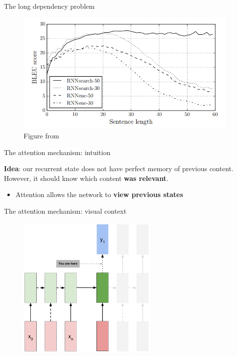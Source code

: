 \documentclass[12pt,aspectratio=169,handout]{beamer}
\begin{document}
\begin{frame}{The long dependency problem}
	\begin{figure}[h]
		\includegraphics[height=6cm]{sequence_length}
		\caption*{Figure from \cite{bahdanau2014neural}}
	\end{figure}
	
\end{frame}
	

\begin{frame}{The attention mechanism: intuition}

\textbf{Idea}: our recurrent state does not have perfect memory of previous content.
However, it should know which content \textbf{was relevant}.
\begin{itemize}
	\item Attention allows the network to \textbf{view previous states}
\end{itemize} 

\end{frame}

\begin{frame}{The attention mechanism: visual context}
	\begin{figure}[h]
		\includegraphics[height=7cm]{seq2seq_attention_motivation.pdf}
	\end{figure}	
\end{frame}
\end{document}
